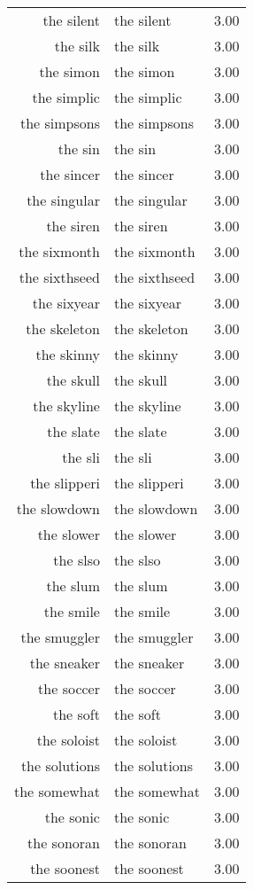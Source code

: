 \begin{table}[ht]
\begin{tabular}{rlr}
  the silent & the silent & 3.00 \\ 
  the silk & the silk & 3.00 \\ 
  the simon & the simon & 3.00 \\ 
  the simplic & the simplic & 3.00 \\ 
  the simpsons & the simpsons & 3.00 \\ 
  the sin & the sin & 3.00 \\ 
  the sincer & the sincer & 3.00 \\ 
  the singular & the singular & 3.00 \\ 
  the siren & the siren & 3.00 \\ 
  the sixmonth & the sixmonth & 3.00 \\ 
  the sixthseed & the sixthseed & 3.00 \\ 
  the sixyear & the sixyear & 3.00 \\ 
  the skeleton & the skeleton & 3.00 \\ 
  the skinny & the skinny & 3.00 \\ 
  the skull & the skull & 3.00 \\ 
  the skyline & the skyline & 3.00 \\ 
  the slate & the slate & 3.00 \\ 
  the sli & the sli & 3.00 \\ 
  the slipperi & the slipperi & 3.00 \\ 
  the slowdown & the slowdown & 3.00 \\ 
  the slower & the slower & 3.00 \\ 
  the slso & the slso & 3.00 \\ 
  the slum & the slum & 3.00 \\ 
  the smile & the smile & 3.00 \\ 
  the smuggler & the smuggler & 3.00 \\ 
  the sneaker & the sneaker & 3.00 \\ 
  the soccer & the soccer & 3.00 \\ 
  the soft & the soft & 3.00 \\ 
  the soloist & the soloist & 3.00 \\ 
  the solutions & the solutions & 3.00 \\ 
  the somewhat & the somewhat & 3.00 \\ 
  the sonic & the sonic & 3.00 \\ 
  the sonoran & the sonoran & 3.00 \\ 
  the soonest & the soonest & 3.00 \\ 

\end{tabular}
\end{table}
